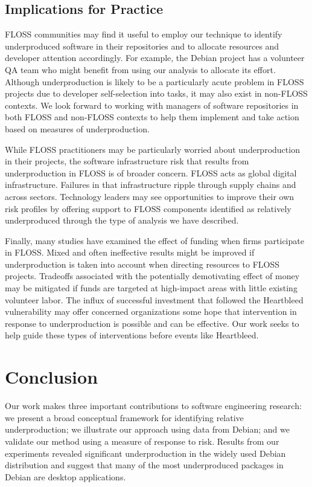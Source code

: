 \documentclass[10pt,conference]{IEEEtran}\usepackage[]{graphicx}\usepackage[usenames,dvipsnames]{color}
\begin{document}
\subsection{Implications for Practice}

FLOSS communities may find it useful to employ our technique to identify underproduced software in their repositories and to allocate resources and developer attention accordingly. For example, the Debian project has a volunteer QA team who might benefit from using our analysis to allocate its effort.
Although underproduction is likely to be a particularly acute problem in FLOSS projects due to developer self-selection into tasks, it may also exist in non-FLOSS contexts. We look forward to working with managers of software repositories in both FLOSS and non-FLOSS contexts to help them implement and take action based on measures of underproduction.

While FLOSS practitioners may be particularly worried about underproduction in their projects, the software infrastructure risk that results from underproduction in FLOSS is of broader concern. FLOSS acts as global digital infrastructure. Failures in that infrastructure ripple through supply chains and across sectors. Technology leaders may see opportunities to improve their own risk profiles by offering support to FLOSS components identified as relatively underproduced through the type of analysis we have described. 

Finally, many studies have examined the effect of funding when firms participate in FLOSS. Mixed and often ineffective results might be improved if underproduction is taken into account when directing resources to FLOSS projects. Tradeoffs associated with the potentially demotivating effect of money may be mitigated if funds are targeted at high-impact areas with little existing volunteer labor.
The influx of successful investment that followed the Heartbleed vulnerability \cite{walden_impact_2020} may offer concerned organizations some hope that intervention in response to underproduction is possible and can be effective. Our work seeks to help guide these types of interventions before events like Heartbleed.

\section{Conclusion}
\label{sec:conclusion}
Our work makes three important contributions to software engineering research: we present a broad conceptual framework for identifying relative underproduction; we illustrate our approach using data from Debian; and we validate our method using a measure of response to risk.
Results from our experiments revealed significant underproduction in the widely used Debian distribution and suggest that many of the most underproduced packages in Debian are desktop applications. 
\end{document}
